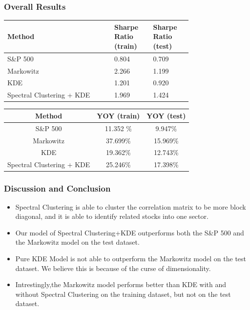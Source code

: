 \documentclass{beamer}
\begin{document}
\begin{frame}
    \frametitle{Overall Results}
    \begin{table}[H]
        \centering
        \begin{tabular}{|p{0.45\linewidth}|p{0.15\linewidth}|p{0.15\linewidth}|}
            \hline
            Method & Sharpe Ratio (train) & Sharpe Ratio (test)\\
            \hline
            S\&P 500 & 0.804 & 0.709 \\
            Markowitz & 2.266 & 1.199 \\
            KDE & 1.201 & 0.920 \\
            Spectral Clustering + KDE & 1.969 & 1.424\\
            \hline
        \end{tabular}
        \label{tab:sharpe_ratios}
    \end{table}
    \begin{table}[H]
        \centering
        \begin{tabular}{|c|c|c|}
            \hline
            Method & YOY (train) & YOY (test)\\
            \hline
            S\&P 500 & 11.352 \% & 9.947\% \\
            Markowitz & 37.699\% & 15.969\% \\
            KDE & 19.362\% & 12.743\% \\
            Spectral Clustering + KDE & 25.246\% & 17.398\%\\
            \hline
        \end{tabular}
        \label{tab:YoY_returns}
    \end{table}
\end{frame}
\begin{frame}
    \frametitle{Discussion and Conclusion}
    \begin{itemize}
        \item Spectral Clustering is able to cluster the correlation matrix to be more block diagonal, and it is able to identify related stocks into one sector.
        \item Our model of Spectral Clustering+KDE outperforms both the S\&P 500 and the Markowitz model on the test dataset.
        \item Pure KDE Model is not able to outperform the Markowitz model on the test dataset. We believe this is because of the curse of dimensionality.
        \item Intrestingly,the Markowitz model performs better than KDE with and without Spectral Clustering on the training dataset, but not on the test dataset.
    \end{itemize}
\end{frame}
\end{document}
